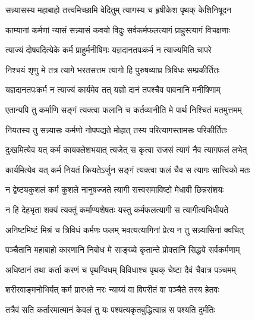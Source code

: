 

\twolineshloka
{सन्न्यासस्य महाबाहो तत्त्वमिच्छामि वेदितुम्}
{त्यागस्य च हृषीकेश पृथक् केशिनिषूदन}%


\twolineshloka
{काम्यानां कर्मणां न्यासं सन्न्यासं कवयो विदुः}
{सर्वकर्मफलत्यागं प्राहुस्त्यागं विचक्षणाः}%

\twolineshloka
{त्याज्यं दोषवदित्येके कर्म प्राहुर्मनीषिणः}
{यज्ञदानतपःकर्म न त्याज्यमिति चापरे}%

\twolineshloka
{निश्चयं शृणु मे तत्र त्यागे भरतसत्तम}
{त्यागो हि पुरुषव्याघ्र त्रिविधः सम्प्रकीर्तितः}%

\twolineshloka
{यज्ञदानतपःकर्म न त्याज्यं कार्यमेव तत्}
{यज्ञो दानं तपश्चैव पावनानि मनीषिणाम्}%

\twolineshloka
{एतान्यपि तु कर्माणि सङ्गं त्यक्त्वा फलानि च}
{कर्तव्यानीति मे पार्थ निश्चितं मतमुत्तमम्}%

\twolineshloka
{नियतस्य तु सन्न्यासः कर्मणो नोपपद्यते}
{मोहात् तस्य परित्यागस्तामसः परिकीर्तितः}%

\twolineshloka
{दुःखमित्येव यत् कर्म कायक्लेशभयात् त्यजेत्}
{स कृत्वा राजसं त्यागं नैव त्यागफलं लभेत्}%

\twolineshloka
{कार्यमित्येव यत् कर्म नियतं क्रियतेऽर्जुन}
{सङ्गं त्यक्त्वा फलं चैव स त्यागः सात्त्विको मतः}%

\twolineshloka
{न द्वेष्ट्यकुशलं कर्म कुशले नानुषज्जते}
{त्यागी सत्त्वसमाविष्टो मेधावी छिन्नसंशयः}%

\twolineshloka
{न हि देहभृता शक्यं त्यक्तुं कर्माण्यशेषतः}
{यस्तु कर्मफलत्यागी स त्यागीत्यभिधीयते}%

\twolineshloka
{अनिष्टमिष्टं मिश्रं च त्रिविधं कर्मणः फलम्}
{भवत्यत्यागिनां प्रेत्य न तु सन्न्यासिनां क्वचित्}%

\twolineshloka
{पञ्चैतानि महाबाहो कारणानि निबोध मे}
{साङ्ख्ये कृतान्ते प्रोक्तानि सिद्धये सर्वकर्मणाम्}%

\twolineshloka
{अधिष्ठानं तथा कर्ता करणं च पृथग्विधम्}
{विविधाश्च पृथक् चेष्टा दैवं चैवात्र पञ्चमम्}%

\twolineshloka
{शरीरवाङ्मनोभिर्यत् कर्म प्रारभते नरः}
{न्याय्यं वा विपरीतं वा पञ्चैते तस्य हेतवः}%

\twolineshloka
{तत्रैवं सति कर्तारमात्मानं केवलं तु यः}
{पश्यत्यकृतबुद्धित्वान्न स पश्यति दुर्मतिः}%

